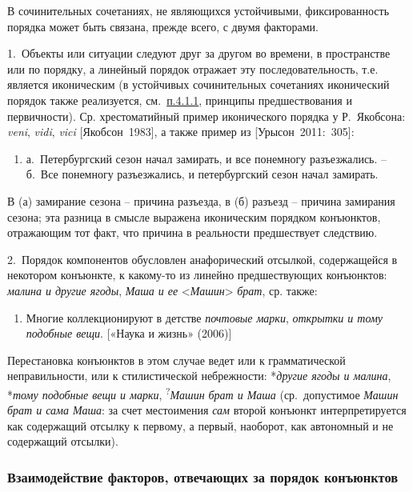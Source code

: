 В сочинительных сочетаниях, не являющихся устойчивыми, фиксированность
порядка может быть связана, прежде всего, с двумя факторами.

1.~Объекты или ситуации следуют друг за другом во времени, в
пространстве или по порядку, а линейный порядок отражает эту
последовательность, т.е. является иконическим (в устойчивых
сочинительных сочетаниях иконический порядок также реализуется,
см.~\underline{п.4.1.1}, принципы предшествования и первичности). Ср.
хрестоматийный пример иконического порядка у Р.~Якобсона: \emph{veni},
\emph{vidi}, \emph{vici} {[}Якобсон~1983{]}, а также пример из
{[}Урысон~2011:~305{]}:

\begin{enumerate}
\def\labelenumi{(\arabic{enumi})}
\setcounter{enumi}{25}
\item
  а.~Петербургский сезон начал замирать, и все понемногу разъезжались.
  -- б.~Все понемногу разъезжались, и петербургский сезон начал
  замирать.
\end{enumerate}

В (а) замирание сезона -- причина разъезда, в (б) разъезд -- причина
замирания сезона; эта разница в смысле выражена иконическим порядком
конъюнктов, отражающим тот факт, что причина в реальности предшествует
следствию.

2.~Порядок компонентов обусловлен анафорический отсылкой, содержащейся в
некотором конъюнкте, к какому-то из линейно предшествующих конъюнктов:
\emph{малина и другие ягоды}, \emph{Маша и ее}
\textless{}\emph{Машин}\textgreater{} \emph{брат}, ср. также:

\begin{enumerate}
\def\labelenumi{(\arabic{enumi})}
\setcounter{enumi}{26}
\item
  Многие коллекционируют в детстве \emph{почтовые марки}, \emph{открытки
  и тому подобные вещи}. {[}«Наука и жизнь» (2006){]}
\end{enumerate}

Перестановка конъюнктов в этом случае ведет или к грамматической
неправильности, или к стилистической небрежности: *\emph{другие ягоды и
малина}, *\emph{тому подобные вещи и марки},
\textsuperscript{?}\emph{Машин брат и Маша} (ср.~допустимое \emph{Машин
брат и сама Маша}: за счет местоимения \emph{сам} второй конъюнкт
интерпретируется как содержащий отсылку к первому, а первый, наоборот,
как автономный и не содержащий отсылки).

\hypertarget{ux432ux437ux430ux438ux43cux43eux434ux435ux439ux441ux442ux432ux438ux435-ux444ux430ux43aux442ux43eux440ux43eux432-ux43eux442ux432ux435ux447ux430ux44eux449ux438ux445-ux437ux430-ux43fux43eux440ux44fux434ux43eux43a-ux43aux43eux43dux44aux44eux43dux43aux442ux43eux432}{%
\subsubsection{Взаимодействие факторов, отвечающих за порядок
конъюнктов}\label{ux432ux437ux430ux438ux43cux43eux434ux435ux439ux441ux442ux432ux438ux435-ux444ux430ux43aux442ux43eux440ux43eux432-ux43eux442ux432ux435ux447ux430ux44eux449ux438ux445-ux437ux430-ux43fux43eux440ux44fux434ux43eux43a-ux43aux43eux43dux44aux44eux43dux43aux442ux43eux432}}

